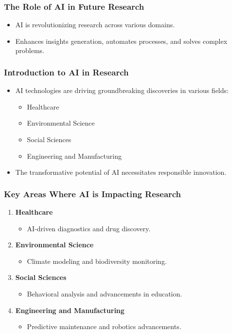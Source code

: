 \documentclass[aspectratio=169]{beamer}
\begin{document}
\begin{frame}[fragile]
    \frametitle{The Role of AI in Future Research}
    \begin{itemize}
        \item AI is revolutionizing research across various domains.
        \item Enhances insights generation, automates processes, and solves complex problems.
    \end{itemize}
\end{frame}

\begin{frame}[fragile]
    \frametitle{Introduction to AI in Research}
    \begin{itemize}
        \item AI technologies are driving groundbreaking discoveries in various fields:
        \begin{itemize}
            \item Healthcare
            \item Environmental Science
            \item Social Sciences
            \item Engineering and Manufacturing
        \end{itemize}
        \item The transformative potential of AI necessitates responsible innovation.
    \end{itemize}
\end{frame}

\begin{frame}[fragile]
    \frametitle{Key Areas Where AI is Impacting Research}
    \begin{enumerate}
        \item \textbf{Healthcare}
            \begin{itemize}
                \item AI-driven diagnostics and drug discovery.
            \end{itemize}
        \item \textbf{Environmental Science}
            \begin{itemize}
                \item Climate modeling and biodiversity monitoring.
            \end{itemize}
        \item \textbf{Social Sciences}
            \begin{itemize}
                \item Behavioral analysis and advancements in education.
            \end{itemize}
        \item \textbf{Engineering and Manufacturing}
            \begin{itemize}
                \item Predictive maintenance and robotics advancements.
            \end{itemize}
    \end{enumerate}
\end{frame}
\end{document}
